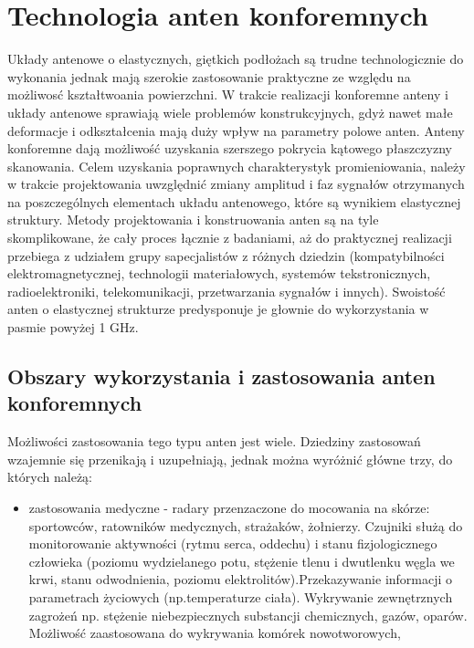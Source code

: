 \begin{itemize}
\begin{itemize}
\begin{itemize}
\end{itemize}




\chapter{Technologia anten konforemnych}

Układy antenowe o elastycznych, giętkich podłożach są trudne technologicznie do wykonania jednak mają szerokie zastosowanie praktyczne ze względu na możliwosć kształtwoania powierzchni. 
W trakcie realizacji konforemne anteny i układy antenowe sprawiają wiele problemów konstrukcyjnych, gdyż nawet małe deformacje i odkształcenia mają duży wpływ na parametry polowe anten. 
Anteny konforemne dają możliwość uzyskania szerszego pokrycia kątowego płaszczyzny skanowania. Celem uzyskania poprawnych charakterystyk promieniowania, należy w trakcie projektowania uwzględnić zmiany amplitud i faz sygnałów otrzymanych na poszczególnych elementach układu antenowego, które są wynikiem elastycznej struktury.    
Metody projektowania i konstruowania anten są na tyle skomplikowane, że cały proces łącznie z badaniami, aż do praktycznej realizacji przebiega z udziałem grupy sapecjalistów z różnych dziedzin (kompatybilności elektromagnetycznej, technologii materiałowych, systemów tekstronicznych, radioelektroniki, telekomunikacji, przetwarzania sygnałów i innych). Swoistość anten o elastycznej strukturze predysponuje je głownie do wykorzystania w pasmie powyżej 1 GHz.     

\section{Obszary wykorzystania i zastosowania anten konforemnych}

Możliwości zastosowania tego typu anten jest wiele. Dziedziny zastosowań wzajemnie się przenikają i uzupełniają, jednak można wyróżnić główne trzy, do których należą:

\begin{itemize}\setlength{\itemsep}{0pt}
	
	\item zastosowania medyczne - radary przenzaczone do mocowania na skórze: sportowców, ratowników medycznych, strażaków, żołnierzy. Czujniki służą do monitorowanie aktywności (rytmu serca, oddechu) i stanu fizjologicznego człowieka (poziomu wydzielanego potu, stężenie tlenu i dwutlenku węgla we krwi, stanu odwodnienia, poziomu elektrolitów).Przekazywanie informacji o parametrach życiowych (np.temperaturze ciała). Wykrywanie zewnętrznych zagrożeń np. stężenie niebezpiecznych substancji chemicznych, gazów, oparów. Możliwość zaastosowana do wykrywania komórek nowotworowych,  


\end{itemize}
\end{itemize}
\end{itemize}
